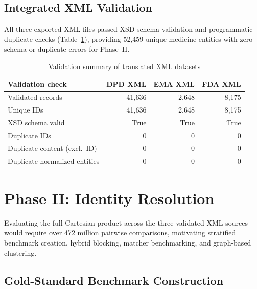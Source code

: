 \documentclass{llncs}
\begin{document}
\subsection{Integrated XML Validation}

All three exported XML files passed XSD schema validation and programmatic duplicate checks (Table~\ref{tab:xml_validation}), providing 52,459 unique medicine entities with zero schema or duplicate errors for Phase~II.

\begin{table}[htbp]
\centering
\caption{Validation summary of translated XML datasets}
\label{tab:xml_validation}
\scriptsize
\setlength{\tabcolsep}{4pt}
\begin{tabular}{|l|r|r|r|}
\hline
\textbf{Validation check} & \textbf{DPD XML} & \textbf{EMA XML} & \textbf{FDA XML} \\
\hline
Validated records            & 41,636 & 2,648 & 8,175 \\
Unique IDs                   & 41,636 & 2,648 & 8,175 \\
XSD schema valid             & True   & True  & True  \\
Duplicate IDs                & 0      & 0     & 0     \\
Duplicate content (excl.\ ID)& 0      & 0     & 0     \\
Duplicate normalized entities& 0      & 0     & 0     \\
\hline
\end{tabular}
\end{table}


\section{Phase II: Identity Resolution}

Evaluating the full Cartesian product across the three validated XML sources would require over 472 million pairwise comparisons, motivating stratified benchmark creation, hybrid blocking, matcher benchmarking, and graph-based clustering.

\subsection{Gold-Standard Benchmark Construction}
\end{document}
